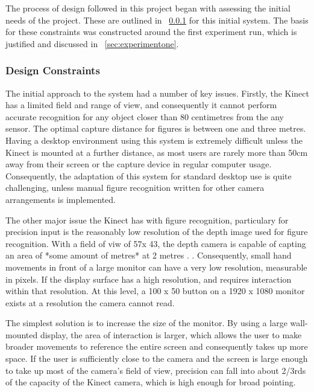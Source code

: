 The process of design followed in this project began with assessing the initial needs of the project. These are outlined in ~\ref{sec:designconstraints} for this initial system. The basis for these constraints was constructed around the first experiment run, which is justified and discussed in ~\ref{sec:experimentone}. 

\subsubsection{Design Constraints}
\label{sec:designconstraints}

The initial approach to the system had a number of key issues. Firstly, the Kinect has a limited field and range of view, and consequently it cannot perform accurate recognition for any object closer than 80 centimetres from the any sensor. The optimal capture distance for figures is between one and three metres. Having a desktop environment using this system is extremely difficult unless the Kinect is mounted at a further distance, as most users are rarely more than 50cm away from their screen or the capture device in regular computer usage. Consequently, the adaptation of this system for standard desktop use is quite challenging, unless manual figure recognition written for other camera arrangements is implemented. 

The other major issue the Kinect has with figure recognition, particulary for precision input is the reasonably low resolution of the depth image used for figure recognition. With a field of viw of 57\degree x 43\degree, the depth camera is capable of capting an area of *some amount of metres* at 2 metres . . Consequently, small hand movements in front of a large monitor can have a very low resolution, measurable in pixels. If the display surface has a high resolution, and requires interaction within that resolution. At this level, a 100 x 50 button on a 1920 x 1080 monitor exists at a resolution the camera cannot read.

The simplest solution is to increase the size of the monitor. By using a large wall-mounted display, the area of interaction is larger, which allows the user to make broader movements to reference the entire screen and consequently takes up more space. If the user is sufficiently close to the camera and the screen is large enough to take up most of the camera's field of view, precision can fall into about 2/3rds of the capacity of the Kinect camera, which is high enough for broad pointing. 

